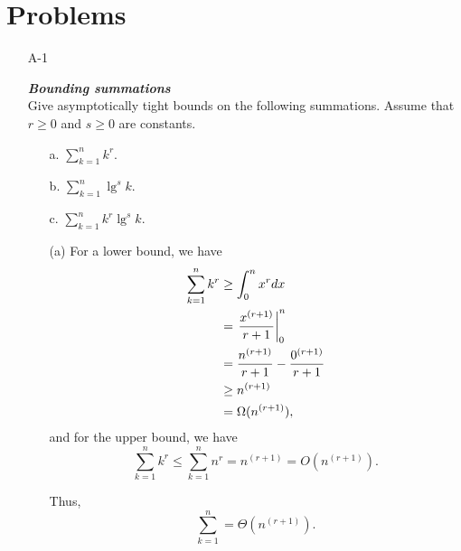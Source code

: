 \newpage

\section*{Problems}
%

\begin{enumerate}

\item[A{-}1]{\textbf{\emph{Bounding summations}}\\
Give asymptotically tight bounds on the following summations. Assume that
$r \ge 0$ and $s \ge 0$ are constants.
\begin{enumerate}
  \item[a.] $\sum_{k = 1}^{n} k^r$.
  \item[b.] $\sum_{k = 1}^{n} \lg^s k$.
  \item[c.] $\sum_{k = 1}^{n} k^r \lg^s k$.
\end{enumerate}
}

\begin{framed}
\begin{enumerate}
\item[(a)] For a lower bound, we have
\begin{equation*}
\begin{aligned}
  \sum_{k = 1}^{n} k^r &\ge \int_{0}^{n} x^r dx\\
                       &=   \left.\frac{x^{(r + 1)}}{r + 1}\right\rvert_{0}^{n}\\
                       &=   \frac{n^{(r + 1)}}{r + 1} - \frac{0^{(r + 1)}}{r + 1}\\
                       &\ge n^{(r + 1)}\\
                       &=   \Omega(n^{(r + 1)}),
\end{aligned}
\end{equation*}
and for the upper bound, we have
\[
  \sum_{k = 1}^{n} k^r \le \sum_{k = 1}^{n} n^r = n^{(r + 1)} = O(n^{(r + 1)}).
\]

Thus,
\[
  \sum_{k = 1}^{n} = \Theta(n^{(r + 1)}).
\]


\end{enumerate}
\end{framed}
\end{enumerate}
